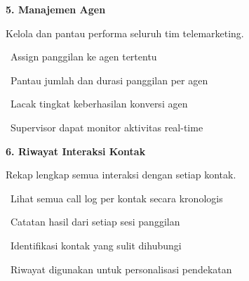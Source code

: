 \documentclass[a4paper]{article}
\begin{document}
\vspace{8pt}

\noindent
\begin{minipage}[t]{0.485\textwidth}
    \colorbox{OrangePrimary}{%
        \begin{minipage}{\dimexpr\textwidth-2\fboxsep\relax}
            {\fontsize{10}{13}\selectfont\bfseries\color{White} 5. Manajemen Agen}
        \end{minipage}}\par
    \vspace{4pt}
    {\fontsize{9}{12}\selectfont\color{TextDark}%
    Kelola dan pantau performa seluruh tim telemarketing.\par\vspace{3pt}
    \textbullet\ Assign panggilan ke agen tertentu\par\vspace{2pt}%
    \textbullet\ Pantau jumlah dan durasi panggilan per agen\par\vspace{2pt}%
    \textbullet\ Lacak tingkat keberhasilan konversi agen\par\vspace{2pt}%
    \textbullet\ Supervisor dapat monitor aktivitas real-time}%
\end{minipage}%
\hfill
\begin{minipage}[t]{0.485\textwidth}
    \colorbox{CrimsonDark}{%
        \begin{minipage}{\dimexpr\textwidth-2\fboxsep\relax}
            {\fontsize{10}{13}\selectfont\bfseries\color{White} 6. Riwayat Interaksi Kontak}
        \end{minipage}}\par
    \vspace{4pt}
    {\fontsize{9}{12}\selectfont\color{TextDark}%
    Rekap lengkap semua interaksi dengan setiap kontak.\par\vspace{3pt}
    \textbullet\ Lihat semua call log per kontak secara kronologis\par\vspace{2pt}%
    \textbullet\ Catatan hasil dari setiap sesi panggilan\par\vspace{2pt}%
    \textbullet\ Identifikasi kontak yang sulit dihubungi\par\vspace{2pt}%
    \textbullet\ Riwayat digunakan untuk personalisasi pendekatan}%
\end{minipage}
\end{document}
